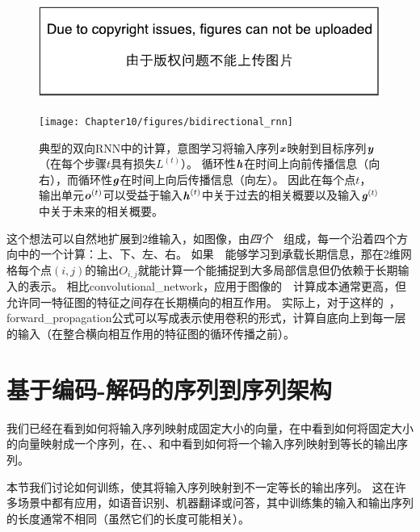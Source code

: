 
\begin{figure}[!htb]
\ifOpenSource
\centerline{\includegraphics{figure.pdf}}
\else
\centerline{\texttt{[image: Chapter10/figures/bidirectional\_rnn]}}
\fi
\caption{典型的双向\gls{RNN}中的计算，意图学习将输入序列$\boldsymbol{\mathit{x}}$映射到目标序列$\boldsymbol{\mathit{y}}$（在每个步骤$t$具有损失$L^{(t)}$）。
循环性$\boldsymbol{\mathit{h}}$在时间上向前传播信息（向右），而循环性$\boldsymbol{\mathit{g}}$在时间上向后传播信息（向左）。
因此在每个点$t$，输出单元$\boldsymbol{\mathit{o}}^{(t)}$可以受益于输入$\boldsymbol{\mathit{h}}^{(t)}$中关于过去的相关概要以及输入$\boldsymbol{\mathit{g}}^{(t)}$中关于未来的相关概要。
}
\label{fig:chap10_bidirectional_rnn}
\end{figure}

这个想法可以自然地扩展到2维输入，如图像，由\emph{四个}~~组成，每一个沿着四个方向中的一个计算：上、下、左、右。
如果~~能够学习到承载长期信息，那在2维网格每个点$(i, j)$的输出$O_{i,j}$就能计算一个能捕捉到大多局部信息但仍依赖于长期输入的表示。
相比\gls{convolutional_network}，应用于图像的~~计算成本通常更高，但允许同一特征图的特征之间存在长期横向的相互作用\citep{Visin-et-al-arxiv2015-renet,kalchbrenner2015grid}。
实际上，对于这样的~，\gls{forward_propagation}公式可以写成表示使用卷积的形式，计算自底向上到每一层的输入（在整合横向相互作用的特征图的循环传播之前）。


\section{基于编码-解码的序列到序列架构}
\label{sec:encoder_decoder_sequence_to_sequence_architectures}
我们已经在看到如何将输入序列映射成固定大小的向量，在中看到如何将固定大小的向量映射成一个序列，在、、和中看到如何将一个输入序列映射到等长的输出序列。

本节我们讨论如何训练，使其将输入序列映射到不一定等长的输出序列。
这在许多场景中都有应用，如语音识别、机器翻译或问答，其中训练集的输入和输出序列的长度通常不相同（虽然它们的长度可能相关）。

